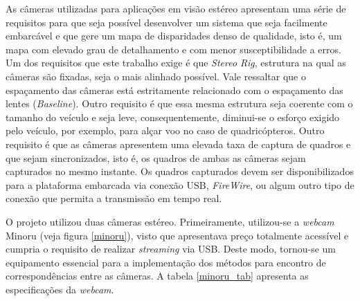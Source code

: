 As câmeras utilizadas para aplicações em visão estéreo apresentam uma série de requisitos para que seja possível desenvolver um sistema que seja facilmente embarcável e que gere um mapa de disparidades denso de qualidade, isto é, um mapa com elevado grau de detalhamento e com menor susceptibilidade a erros. Um dos requisitos que este trabalho exige é que \textit{Stereo Rig}, estrutura na qual as câmeras são fixadas, seja o mais alinhado possível. Vale ressaltar que o espaçamento das câmeras está estritamente relacionado com o espaçamento das lentes (\textit{Baseline}). Outro requisito é que essa mesma estrutura seja coerente com o tamanho do veículo e seja leve, consequentemente, diminui-se o esforço exigido pelo veículo, por exemplo, para alçar voo no caso de quadricópteros. Outro requisito é que as câmeras apresentem uma elevada taxa de captura de quadros e que sejam sincronizados, isto é, os quadros de ambas as câmeras sejam capturados no mesmo instante. Os quadros capturados devem ser disponibilizados para a plataforma embarcada via conexão USB, \textit{FireWire}, ou algum outro tipo de conexão que permita a transmissão em tempo real.

O projeto utilizou duas câmeras estéreo. Primeiramente, utilizou-se a \textit{webcam} Minoru (veja figura \ref{minoru}), visto que apresentava preço totalmente acessível e cumpria o requisito de realizar \textit{streaming} via USB. Deste modo, tornou-se um equipamento essencial para a implementação dos métodos para encontro de correspondências entre as câmeras. A tabela \ref{minoru_tab} apresenta as especificações da \textit{webcam}.

